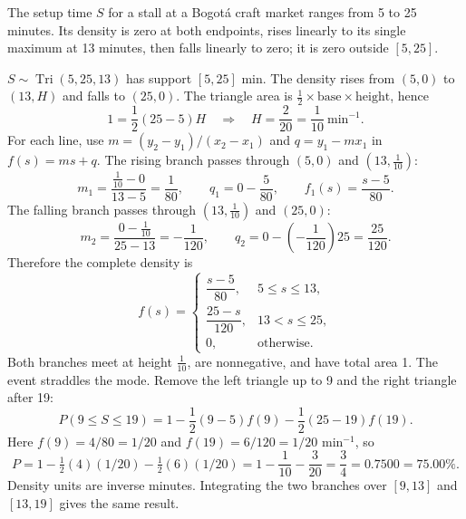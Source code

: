 \clearpage\def\CurrentProblem{stall}
The setup time $S$ for a stall at a Bogotá craft market ranges from 5 to 25 minutes. Its density is zero at both endpoints, rises linearly to its single maximum at 13 minutes, then falls linearly to zero; it is zero outside $[5,25]$.



$S\sim\operatorname{Tri}(5,25,13)$ has support $[5,25]$ min. The density rises from $(5,0)$ to $(13,H)$ and falls to $(25,0)$.
The triangle area is $\tfrac12\times\text{base}\times\text{height}$, hence
\[1=\frac12(25-5)H\quad\Longrightarrow\quad H=\frac2{20}=\frac1{10}\ \mathrm{min}^{-1}.\]
For each line, use $m=(y_2-y_1)/(x_2-x_1)$ and $q=y_1-mx_1$ in $f(s)=ms+q$.
The rising branch passes through $(5,0)$ and $(13,\frac1{10})$:
\[m_1=\frac{\frac1{10}-0}{13-5}=\frac1{80},\qquad q_1=0-\frac{5}{80},\qquad f_1(s)=\frac{s-5}{80}.\]
The falling branch passes through $(13,\frac1{10})$ and $(25,0)$:
\[m_2=\frac{0-\frac1{10}}{25-13}=-\frac1{120},\qquad q_2=0-\left(-\frac1{120}\right)25=\frac{25}{120}.\]
Therefore the complete density is
\[f(s)=\begin{cases}\dfrac{s-5}{80},&5\le s\le13,\\[1mm]
\dfrac{25-s}{120},&13<s\le 25,\\[1mm]0,&\text{otherwise}.\end{cases}\]
Both branches meet at height $\frac1{10}$, are nonnegative, and have total area 1.
\Needspace{11cm}
The event straddles the mode. Remove the left triangle up to 9 and the right triangle after 19:
\[P(9\le S\le19)=1-\frac12(9-5)f(9)-\frac12(25-19)f(19).\]
Here $f(9)=4/80=1/20$ and $f(19)=6/120=1/20$ min$^{-1}$, so
\[P=1-\tfrac12(4)(1/20)-\tfrac12(6)(1/20)=1-\frac1{10}-\frac3{20}=\boxed{\frac34=0.7500=75.00\%}.\]
Density units are inverse minutes. Integrating the two branches over $[9,13]$ and $[13,19]$ gives the same result.

